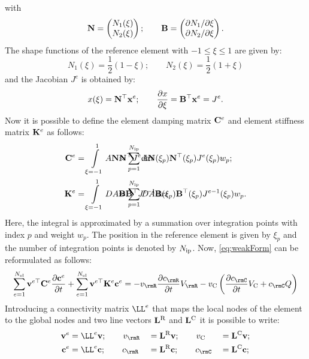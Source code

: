 \documentclass{article}
\begin{document}
  with
  \begin{equation}
    {\bf{N}} = \begin{pmatrix} N_1(\xi) \\ N_2(\xi) \end{pmatrix}; \qquad 
    {\bf{B}} = \begin{pmatrix} \partial N_1 / \partial \xi \\ \partial N_2 /\partial \xi \end{pmatrix}.
  \end{equation}
  The shape functions of the reference element with $-1\le\xi\le 1$ are given by:
  \begin{equation}
    N_1(\xi) = \frac{1}{2}(1-\xi); \qquad N_2(\xi) = \frac{1}{2}(1+\xi)
  \end{equation}
  and the Jacobian $J^e$ is obtained by:
  \begin{equation}
    x(\xi) = {\bf{N}}^{\top}{\bf{x}}^e ; \qquad \frac{\partial x}{\partial \xi} = {\bf{B}}^{\top} {\bf{x}}^e = J^e.
  \end{equation}
  Now it is possible to define the element damping matrix ${\bf{C}}^e$ and element stiffness matrix ${\bf{K}}^e$ as follows:
  \begin{align}
    \CCe &= \intXi A \NN \NNT J^e \rmd xi&&\hspace{-2.5cm}\approx \sumip A \NN(\xi_p) \NNT(\xi_p) J^e(\xi_p) w_p; \label{eq:CCe}\\
    \KKe &= \intXi D A \BB \BBT \Jeinv \rmd xi&&\hspace{-2.5cm}\approx \sumip D A \BB(\xi_p) \BBT(\xi_p) \Jeinv(\xi_p) w_p. \label{eq:KKe}
  \end{align}
  Here, the integral is approximated by a summation over integration points with index $p$ and weight $w_p$. The position in the reference element is given by $\xi_p$ and the number of integration points is denoted by $N_{\rm ip}$. Now, \cref{eq:weakForm} can be reformulated as follows:
  \begin{equation}
     \sumel \vveT \CCe \dcceDt + \sumel \vveT \KKe \cce = - v_\rmR \frac{\partial c_\rmR}{\partial t} V_\rmR - \vC \left( \frac{\partial c_\rmC}{\partial t} \VC + c_\rmC Q\right)
     \label{eq:FEMe}
  \end{equation}
  Introducing a connectivity matrix $\LL^e$ that maps the local nodes of the element to the global nodes and two line vectors ${\bf{L}}^{\rm R}$ and ${\bf{L}}^{\rm C}$ it is possible to write:
  \begin{alignat}{3}
    \vve &= \LL^e \vv; \qquad v_\rmR &&= \LLR \vv; \qquad \vC &&= \LLC \vv; \\
    \cce &= \LL^e \cc; \qquad c_\rmR &&= \LLR \cc; \qquad c_\rmC &&= \LLC \cc;
  \end{alignat}
\end{document}
